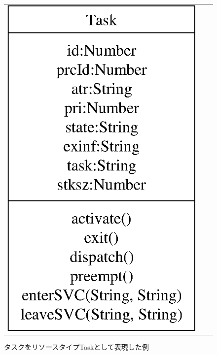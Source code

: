 \begin{figure}[p]
\begin{tabular}{ccc}
\begin{minipage}{0.35\hsize}
\begin{center}
\includegraphics[scale=0.5]{img/resourceTypeSampleByTask.eps}
\caption{タスクをリソースタイプTaskとして表現した例}
\label{fig:resourceTypeSampleByTask}
\end{center}
\end{minipage}
\begin{minipage}{0.25\hsize}

\end{minipage}
\end{tabular}
\end{figure}

